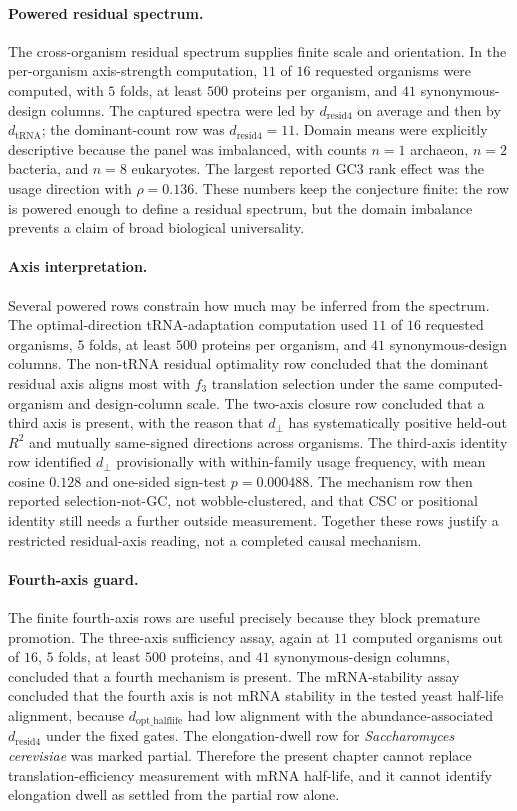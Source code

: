 \paragraph{Powered residual spectrum.}
The cross-organism residual spectrum supplies finite scale and orientation. In the per-organism axis-strength computation, $11$ of $16$ requested organisms were computed, with $5$ folds, at least $500$ proteins per organism, and $41$ synonymous-design columns. The captured spectra were led by $d_{\mathrm{resid4}}$ on average and then by $d_{\mathrm{tRNA}}$; the dominant-count row was $d_{\mathrm{resid4}}=11$. Domain means were explicitly descriptive because the panel was imbalanced, with counts $n=1$ archaeon, $n=2$ bacteria, and $n=8$ eukaryotes. The largest reported GC3 rank effect was the usage direction with $\rho=0.136$. These numbers keep the conjecture finite: the row is powered enough to define a residual spectrum, but the domain imbalance prevents a claim of broad biological universality.

\paragraph{Axis interpretation.}
Several powered rows constrain how much may be inferred from the spectrum. The optimal-direction tRNA-adaptation computation used $11$ of $16$ requested organisms, $5$ folds, at least $500$ proteins per organism, and $41$ synonymous-design columns. The non-tRNA residual optimality row concluded that the dominant residual axis aligns most with $f_3$ translation selection under the same computed-organism and design-column scale. The two-axis closure row concluded that a third axis is present, with the reason that $d_{\perp}$ has systematically positive held-out $R^2$ and mutually same-signed directions across organisms. The third-axis identity row identified $d_{\perp}$ provisionally with within-family usage frequency, with mean cosine $0.128$ and one-sided sign-test $p=0.000488$. The mechanism row then reported selection-not-GC, not wobble-clustered, and that CSC or positional identity still needs a further outside measurement. Together these rows justify a restricted residual-axis reading, not a completed causal mechanism.

\paragraph{Fourth-axis guard.}
The finite fourth-axis rows are useful precisely because they block premature promotion. The three-axis sufficiency assay, again at $11$ computed organisms out of $16$, $5$ folds, at least $500$ proteins, and $41$ synonymous-design columns, concluded that a fourth mechanism is present. The mRNA-stability assay concluded that the fourth axis is not mRNA stability in the tested yeast half-life alignment, because $d_{\mathrm{opt\_halflife}}$ had low alignment with the abundance-associated $d_{\mathrm{resid4}}$ under the fixed gates. The elongation-dwell row for \textit{Saccharomyces cerevisiae} was marked partial. Therefore the present chapter cannot replace translation-efficiency measurement with mRNA half-life, and it cannot identify elongation dwell as settled from the partial row alone.


